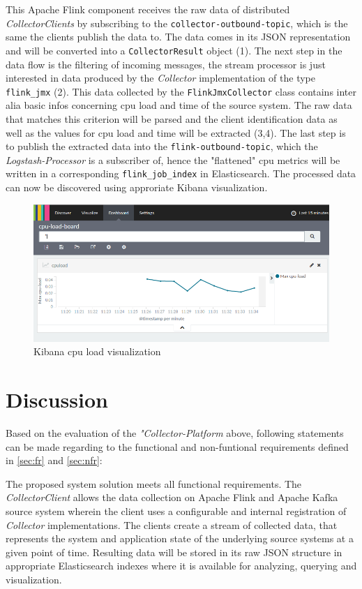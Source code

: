 This Apache Flink component receives the raw data of distributed \textit{CollectorClients} by subscribing to the \verb|collector-outbound-topic|,
which is the same the clients publish the data to. The data comes in its JSON representation and will be converted into a \verb|CollectorResult|
object (1). The next step in the data flow is the filtering of incoming messages, the stream processor is just interested in data
produced by the \textit{Collector} implementation of the type \verb|flink_jmx| (2). This data collected by the  \verb|FlinkJmxCollector| class contains
inter alia basic infos concerning cpu load and time of the source system. The raw data that matches this criterion will be parsed and
the client identification data as well as the values for cpu load and time will be extracted (3,4). The last step is to publish the
extracted data into the \verb|flink-outbound-topic|, which the \textit{Logstash-Processor} is a subscriber of, hence the "flattened"
cpu metrics will be written in a corresponding \verb|flink_job_index| in Elasticsearch. The processed data can now be discovered using approriate Kibana visualization.

\begin{figure}[H]
	\centering
	\includegraphics[width=1.0\textwidth]{../images/14-kibana-cpu.png}
	\caption{Kibana cpu load visualization}
	\label{fig:kibana-cpu}
\end{figure}

\section{Discussion}

Based on the evaluation of the \textit{"Collector-Platform} above, following statements can be made regarding to the functional and
non-funtional requirements defined in \autoref{sec:fr} and \autoref{sec:nfr}:

The proposed system solution meets all functional requirements. The \textit{CollectorClient} allows the data collection on
Apache Flink and Apache Kafka source system wherein the client uses a configurable and internal registration of \textit{Collector} implementations.
The clients create a stream of collected data, that represents the system and application state of the underlying source systems at
a given point of time. Resulting data will be stored in its raw JSON structure in appropriate Elasticsearch indexes where it is available
for analyzing, querying and visualization.

